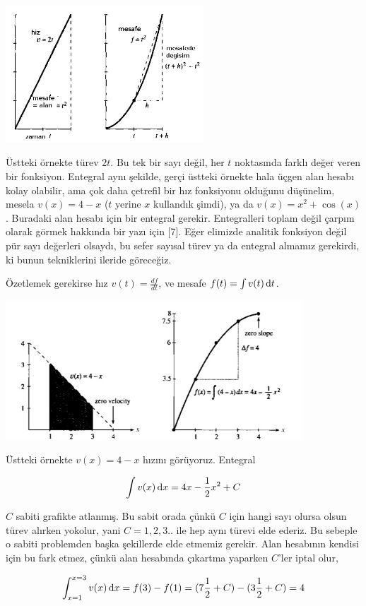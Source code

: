 \documentclass[12pt,fleqn]{article}\usepackage{../../common}
\begin{document}
\includegraphics[width=20em]{phy_005_basics_01_03.jpg}

Üstteki örnekte türev $2t$. Bu tek bir sayı değil, her $t$ noktasında
farklı değer veren bir fonksiyon. Entegral aynı şekilde, gerçi üstteki
örnekte hala üçgen alan hesabı kolay olabilir, ama çok daha çetrefil bir
hız fonksiyonu olduğunu düşünelim, mesela $v(x) = 4 - x$ ($t$ yerine $x$
kullandık şimdi), ya da $v(x) = x^2 + \cos(x)$. Buradaki alan hesabı için
bir entegral gerekir. Entegralleri toplam değil çarpım olarak görmek
hakkında bir yazı için [7]. Eğer elimizde analitik fonksiyon değil pür sayı
değerleri olsaydı, bu sefer sayısal türev ya da entegral almamız gerekirdi,
ki bunun tekniklerini ileride göreceğiz.

Özetlemek gerekirse hız $v(t) = \frac{df}{dt}$, ve mesafe $f(t) = \int v(t)\,\mathrm{d} t$.

\includegraphics[width=30em]{phy_005_basics_01_04.jpg}

Üstteki örnekte $v(x) = 4 - x$ hızını görüyoruz. Entegral 

$$ \int v(x) \,\mathrm{d} x = 4x - \frac{1}{2}x^2 + C $$

$C$ sabiti grafikte atlanmış. Bu sabit orada çünkü $C$ için hangi sayı
olursa olsun türev alırken yokolur, yani $C=1,2,3..$ ile hep aynı türevi
elde ederiz. Bu sebeple o sabiti problemden başka şekillerde elde etmemiz
gerekir. Alan hesabının kendisi için bu fark etmez, çünkü alan hesabında
çıkartma yaparken $C$'ler iptal olur, 

$$ 
\int_{x=1}^{x=3} v(x) \,\mathrm{d} x = f(3) - f(1) = 
(7 \frac{1}{2} + C) - (3 \frac{1}{2} + C) = 4
$$
\end{document}
